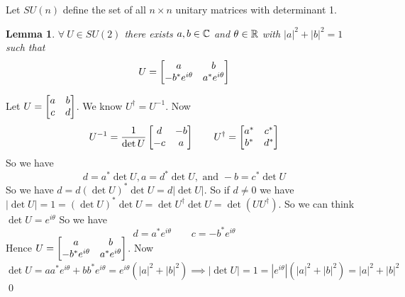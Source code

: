 \documentclass[a4paper, 11pt]{article}
\newtheorem{lemma}{Lemma}
\renewenvironment{proof}{\noindent{\it \textbf{Proof:}}\hspace*{1em}}{\qed\bigskip\\}
\begin{document}
{	Let $SU(n)$ define the set of all $n\times n$ unitary matrices with determinant 1. 
	\begin{lemma}
		$\forall\ U\in SU(2)$ there exists $a,b\in\mathbb{C}$ and $\theta \in \mathbb{R}$ with $|a|^2+|b|^2=1$  such that $$U=\left[\begin{matrix}a & b\\ -b^*e^{i\theta} & a^*e^{i\theta}\end{matrix}\right]$$
	\end{lemma}
	\begin{proof}
		Let $U=\left[\begin{matrix}a & b\\ c & d\end{matrix}\right]$. We know $U^{\dagger}=U^{-1}$. Now $$U^{-1}=\frac1{\det U}\left[\begin{matrix}d & -b\\ -c & a\end{matrix}\right] \qquad U^{\dagger}=\left[\begin{matrix}a^* & c^*\\ b^* & d^*\end{matrix}\right]$$So we have $$d=a^*\det U, a=d^*\det U, \text{ and } -b=c^*\det U$$So we have $d=d(\det U)^*\det U=d|\det U|$. So if $d\neq 0$ we have $|\det U|=1=(\det{U})^*\det U=\det U^{\dagger}\det U=\det (UU^{\dagger})$. So we can think $\det U=e^{i\theta}$ So we have $$d=a^* e^{i\theta}\qquad c=-b^*e^{i\theta}$$Hence $U=\left[\begin{matrix}a & b\\ -b^*e^{i\theta} & a^*e^{i\theta}\end{matrix}\right]$. Now $$\det U=aa^*e^{i\theta} +bb^*e^{i\theta}=e^{i\theta}(|a|^2+|b|^2)\implies |\det U|=1=|e^{i\theta}| (|a|^2+|b|^2)=|a|^2+|b|^2$$
	\end{proof}
}
\end{document}
